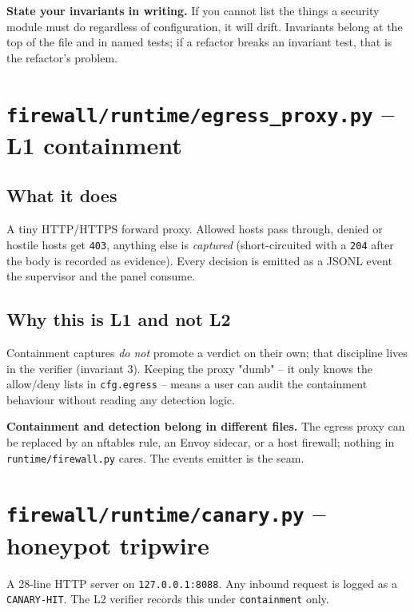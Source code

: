 \documentclass[11pt,a4paper]{article}
\begin{document}
\begin{tip}
\textbf{State your invariants in writing.} If you cannot list the things
a security module must do regardless of configuration, it will drift.
Invariants belong at the top of the file and in named tests; if a
refactor breaks an invariant test, that is the refactor's problem.
\end{tip}

\section{\texttt{firewall/runtime/egress\_proxy.py} -- L1 containment}

\subsection{What it does}
A tiny HTTP/HTTPS forward proxy. Allowed hosts pass through, denied or
hostile hosts get \texttt{403}, anything else is \emph{captured}
(short-circuited with a \texttt{204} after the body is recorded as
evidence). Every decision is emitted as a JSONL event the supervisor
and the panel consume.

\subsection{Why this is L1 and not L2}
Containment captures \emph{do not} promote a verdict on their own; that
discipline lives in the verifier (invariant 3). Keeping the proxy
"dumb" -- it only knows the allow/deny lists in \texttt{cfg.egress} --
means a user can audit the containment behaviour without reading any
detection logic.

\begin{tip}
\textbf{Containment and detection belong in different files.} The egress
proxy can be replaced by an nftables rule, an Envoy sidecar, or a host
firewall; nothing in \texttt{runtime/firewall.py} cares. The events
emitter is the seam.
\end{tip}

\section{\texttt{firewall/runtime/canary.py} -- honeypot tripwire}

A 28-line HTTP server on \texttt{127.0.0.1:8088}. Any inbound request
is logged as a \texttt{CANARY-HIT}. The L2 verifier records this under
\texttt{containment} only.
\end{document}
